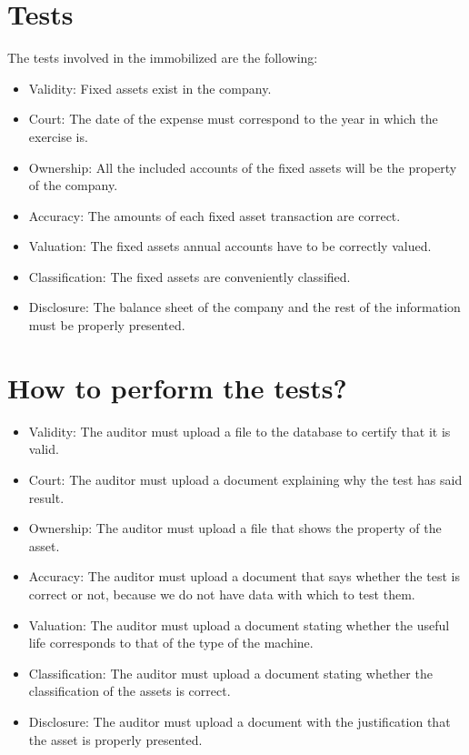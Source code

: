 \documentclass[12pt,letterpaper]{article}
\begin{document}
	\section{Tests}
	The tests involved in the immobilized are the following:
	\begin{itemize}
		\item Validity: Fixed assets exist in the company.
		\item Court: The date of the expense must correspond to the year in which the exercise is.
		\item Ownership: All the included accounts of the fixed assets will be the property of the company.
		\item Accuracy: The amounts of each fixed asset transaction are correct.
		\item Valuation: The fixed assets annual accounts have to be correctly valued.
		\item Classification: The fixed assets are conveniently classified.
		\item Disclosure: The balance sheet of the company and the rest of the information must be properly presented.
	\end{itemize}
	
	\section{How to perform the tests?}
	\begin{itemize}
		\item Validity: The auditor must upload a file to the database to certify that it is valid.
		\item Court: The auditor must upload a document explaining why the test has said result.
		\item Ownership: The auditor must upload a file that shows the property of the asset.
		\item Accuracy: The auditor must upload a document that says whether the test is correct or not, because we do not have data with which to test them.
		\item Valuation: The auditor must upload a document stating whether the useful life corresponds to that of the type of the machine.
		\item Classification: The auditor must upload a document stating whether the classification of the assets is correct.
		\item Disclosure: The auditor must upload a document with the justification that the asset is properly presented.
	\end{itemize}
\end{document}
